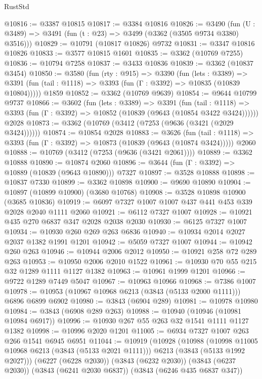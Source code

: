 \begin{lexlean}{RustStd}
\begin{coremodule}
@10816 := @3387 @10815
@10817 := @3384 @10816
@10826 := @3490
    (fun (U : @3489) => @3491 (fun (t : @23) => @3499 (@3362 (@3505 @9734 @3380) @3516)))
@10829 := @10791 (@10817 @10826) @9732
@10831 := @3347 @10816 @10826
@10833 := @3577 @10815 @1601
@10835 := @3362 (@10769 @7255)
@10836 := @10794 @7258
@10837 := @3433 @10836
@10839 := @3362 (@10837 @3454)
@10850 := @3580
    (fun (rty : @915) =>
    @3390
      (fun (lets : @3389) =>
      @3391 (fun (tail : @1118) => @3393 (fun (Γ : @3392) => @10835 (@10839 @10804)))))
    @1859
@10852 := @3362 (@10769 @9639)
@10854 := @9644 @10799 @9737
@10866 := @3602
    (fun (lets : @3389) =>
    @3391
      (fun (tail : @1118) =>
      @3393 (fun (Γ : @3392) => @10852 (@10839 (@9643 (@10854 @3422 @3424))))))
    @2028
@10873 := @3362 (@10769 (@3412 (@7253 (@9636 (@3421 (@2029 @3424))))))
@10874 := @10854 @2028
@10883 := @3626
    (fun (tail : @1118) => @3393 (fun (Γ : @3392) => @10873 (@10839 (@9643 (@10874 @3424)))))
    @2060
@10888 := @10769 (@3412 (@7253 (@9636 (@3421 @2061))))
@10889 := @3362 @10888
@10890 := @10874 @2060
@10896 := @3644 (fun (Γ : @3392) => @10889 (@10839 (@9643 @10890))) @7327
@10897 := @3528 @10888
@10898 := @10837 @7330
@10899 := @3362 @10898
@10900 := @9690 @10890
@10904 := @10897 (@10899 @10900) (@3680 @10768)
@10908 := @3528 @10898 @10900 (@3685 @10836)
@10919 := @6097 @7327 @1007 @1007 @437 @441 @453 @339 @2028 @2040 @1111 @2060
@10921 := @6112 @7327 @1007
@10928 := @10921 @435 @270 @6837 @347 @2028 @2038 @2030
@10930 := @6125 @7327 @1007
@10934 := @10930 @260 @269 @263 @6836
@10940 := @10934 @2014 @2027 @2037 @1382 @1991 @1201
@10942 := @5059 @7327 @1007
@10944 := @10942 @260 @263
@10946 := @10944 @2006 @2012
@10950 := @10921 @258 @72 @289 @263
@10953 := @10950 @2006 @2010 @1522
@10961 := @10930 @70 @55 @215 @32 @1289 @1111 @1127 @1382
@10963 := @10961 @1999 @1201
@10966 := @9722 @1289 @7449 @5047
@10967 := @10963 @10966
@10968 := @7386 @1007
@10978 := @10953 (@10967 @10968 @6213 (@3843 (@5133 @2000 @1111))) @6896 @6899 @6902
@10980 := @3843 (@6904 @289)
@10981 := @10978 @10980
@10984 := @3843 (@6908 @289 @263)
@10988 := @10940 (@10946 (@10981 @10984 @6917))
@10996 := @10930 @267 @55 @263 @32 @1541 @1111 @1127 @1382
@10998 := @10996 @2020 @1201
@11005 := @6934 @7327 @1007 @263 @266 @1541 @6945 @6951
@11044 := @10919
    (@10928
      (@10988
        (@10998 @11005 @10968 @6213 (@3843 (@5133 @2021 @1111)))
        @6213
        (@3843 (@5133 @1992 @2027)))
      (@6227 (@6228 @2030))
      (@3843 (@6232 @2030))
      (@3843 (@6237 @2030))
      (@3843 (@6241 @2030 @6837))
      (@3843 (@6246 @435 @6837 @347))

\end{coremodule}
\end{lexlean}
